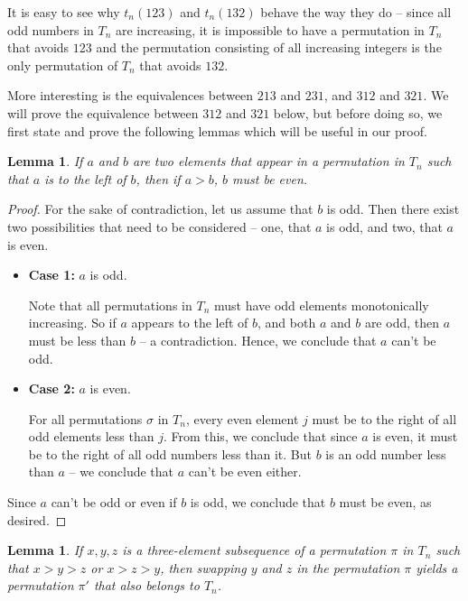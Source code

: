 \documentclass[11pt,letterpaper,twoside,english]{article}
\theoremstyle{theorem}
\newtheorem{lemma}[theorem]{Lemma}
\theoremstyle{remark}
\begin{document}
It is easy to see why $t_n(123)$ and $t_n(132)$ behave the way they do -- since all odd numbers in $T_n$ are increasing, it is impossible to have a permutation in $T_n$ that avoids $123$ and the permutation consisting of all increasing integers is the only permutation of $T_n$ that avoids $132$.

More interesting is the equivalences between $213$ and $231$, and $312$ and $321$. We will prove the equivalence between $312$ and $321$ below, but before doing so, we first state and prove the following lemmas which will be useful in our proof.

\begin{lemma}
\label{tn_avoidance}
If $a$ and $b$ are two elements that appear in a permutation in $T_n$ such that $a$ is to the left of $b$, then if $a > b$, $b$ must be even.
\end{lemma}

\begin{proof}
For the sake of contradiction, let us assume that $b$ is odd. Then there exist two possibilities that need to be considered -- one, that $a$ is odd, and two, that $a$ is even.

\begin{itemize}
\item \textbf{Case 1:} $a$ is odd.

Note that all permutations in $T_n$ must have odd elements monotonically increasing. So if $a$ appears to the left of $b$, and both $a$ and $b$ are odd, then $a$ must be less than $b$ -- a contradiction. Hence, we conclude that $a$ can't be odd.

\item \textbf{Case 2:} $a$ is even.

For all permutations $\sigma$ in $T_n$, every even element $j$ must be to the right of all odd elements less than $j$. From this, we conclude that since $a$ is even, it must be to the right of all odd numbers less than it. But $b$ is an odd number less than $a$ -- we conclude that $a$ can't be even either.
\end{itemize}

Since $a$ can't be odd or even if $b$ is odd, we conclude that $b$ must be even, as desired.
\end{proof}

\begin{lemma}
\label{swapping_lemma}
If $x, y, z$ is a three-element subsequence of a permutation $\pi$ in $T_n$ such that $x > y > z$ or $x > z > y$, then swapping $y$ and $z$ in the permutation $\pi$ yields a permutation $\pi'$ that also belongs to $T_n$.
\end{lemma}
\end{document}
